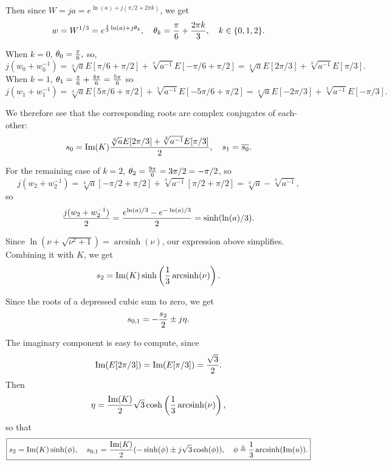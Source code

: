 \documentclass[10pt]{article}
\newcommand{\ol}[1]{\overline{#1}}
\newcommand{\im}{\text{Im}}
\DeclareMathOperator*{\arcsinh}{arcsinh}
\begin{document}
Then since $ W = j a = e^{\ln(a) + j (\pi/2 + 2\pi k)}$, we get $$w = W^{1/3} = e^{{1 \over 3} \ln(a) + j \theta_k}, \quad \theta_k = {\pi \over 6} + {2\pi k \over 3}, \quad k \in \{0, 1, 2\}.$$ 

When $k = 0$, $\theta_0 = {\pi \over 6},$ so, $$j (w_0 + w_0^{-1}) = \sqrt[3]{a}E[\pi/6 + \pi/2] + \sqrt[3]{a^{-1}} E[-\pi/6 + \pi/2] = \sqrt[3]{a}E[2\pi/3] + \sqrt[3]{a^{-1}}E[\pi/3].$$
When $k = 1$, $\theta_1 = {\pi \over 6} + {4\pi \over 6} = {5 \pi \over 6}$ so $$ j(w_1 + w_1^{-1}) = \sqrt[3]{a}E[5 \pi/6 + \pi/2] + \sqrt[3]{a^{-1}}E[-5\pi/6 + \pi/2] = \sqrt[3]{a} E[-2\pi/3] + \sqrt[3]{a^{-1}}E[-\pi/3].$$

We therefore see that the corresponding roots are complex conjugates of each-other:
$$ s_0 = \im(K) { \sqrt[3]{a}E[2\pi/3] + \sqrt[3]{a^{-1}}E[\pi/3] \over 2}, \quad s_1 = \ol{s_0}.$$

For the remaining case of $ k = 2$, $\theta_2 = {9\pi \over 6} = {3\pi/2}=-{\pi/2}$, so
$$ j(w_2 + w_2^{-1}) = \sqrt[3]{a}[-{\pi/2} + \pi/2] + \sqrt[3]{a^{-1}}[\pi/2 + \pi/2] = \sqrt[3]{a} - \sqrt[3]{a^{-1}},$$
so $$ {j (w_2 + w_2^{-1}) \over 2} = {e^{\ln(a)/3} - e^{-\ln(a)/3} \over 2} = \sinh(\ln(a)/3).$$

Since $\ln(\nu + \sqrt{\nu^2+1}) = \arcsinh(\nu)$, our expression above simplifies. Combining it with $K$, we get $$ s_2 = \im(K) \sinh\left({1\over 3}\arcsinh(\nu)\right).$$

Since the roots of a depressed cubic sum to zero, we get $$ s_{0,1} = -{s_2 \over 2} \pm j \eta.$$

The imaginary component is easy to compute, since $$ \im(E[2\pi/3]) = \im(E[\pi/3]) = {\sqrt{3} \over 2}.$$ Then $$\eta = {\im(K) \over 2}\sqrt{3} \cosh\left({1 \over 3} \arcsinh(\nu)\right),$$ so that $$\boxed{s_2 = \im(K) \sinh(\phi), \quad s_{0,1} = {\im(K) \over 2}(-\sinh(\phi) \pm j \sqrt{3} \cosh(\phi)), \quad \phi \triangleq {1 \over 3} \arcsinh(\im(u)).}$$
\end{document}
